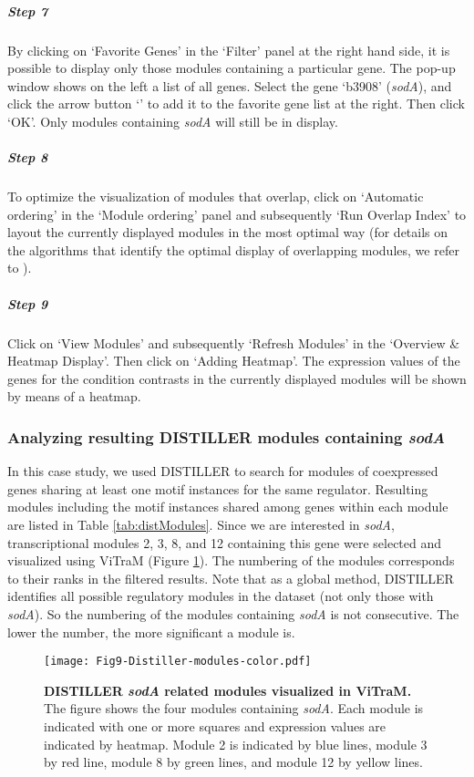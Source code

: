 \begin{small}
\subparagraph{Step 7} By clicking on `Favorite Genes' in the `Filter' panel  at the right hand side, it is possible to display only those modules containing a particular gene. The pop-up window shows on the left a list of all genes. Select the gene `b3908' (\textit{sodA}), and click the arrow button `\textrightarrow' to add it to the favorite gene list at the right.  Then click `OK'.  Only modules containing \textit{sodA} will still be in display.

\subparagraph{Step 8} To optimize the visualization of modules that overlap,  click on `Automatic ordering' in the `Module ordering' panel and subsequently `Run Overlap Index' to layout the currently displayed modules in the most optimal way (for details on the algorithms that identify the optimal display of overlapping modules, we refer to \cite{Sun2009}).

\subparagraph{Step 9} Click on `View Modules' and subsequently `Refresh  Modules' in the `Overview \& Heatmap Display'. Then click on `Adding Heatmap'.  The expression values of the genes for the condition contrasts in the currently  displayed modules will be shown by means of a heatmap.

\end{small} %


\subsubsection{Analyzing resulting DISTILLER modules containing \textit{sodA}}

In this case study, we used DISTILLER to search for modules of coexpressed genes sharing at least one motif instances for the same regulator.  Resulting modules including the motif instances shared among genes within each module are listed in Table \ref{tab:distModules}.  Since we are interested in \textit{sodA}, transcriptional modules 2, 3, 8, and 12 containing this gene were selected and visualized using ViTraM (Figure \ref{fig:vitram}).   The numbering of the modules corresponds to their ranks in the filtered results. Note that as a global method, DISTILLER identifies all possible regulatory modules in the dataset (not only those with \textit{sodA}). So the numbering of the modules containing \textit{sodA} is not consecutive. The lower the number, the more significant a module is.

\begin{figure}[b]
	\centering
  	\texttt{[image: Fig9-Distiller-modules-color.pdf]}
	\caption[DISTILLER \textit{sodA} related modules visualized in ViTraM] 
	{\textbf{DISTILLER \textit{sodA} related modules visualized in ViTraM.}
	The figure shows the four modules containing \textit{sodA}. Each module is 
	indicated with one or more squares and expression values are indicated by 
	heatmap. Module 2 is indicated by blue lines, module 3 by red line, 
	module 8 by green lines, and module 12 by yellow lines.}
	\label{fig:vitram}
\end{figure}

